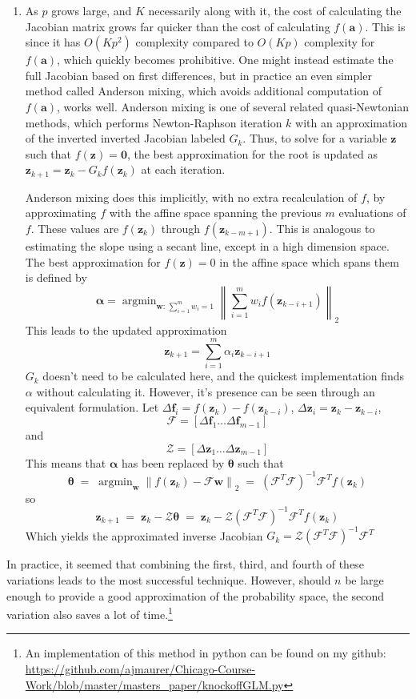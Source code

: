 \documentclass[11pt]{article}
\theoremstyle{definition}
\DeclareMathOperator*{\argmin}{arg\min}
\begin{document}
\begin{enumerate}
            \item As $p$ grows large, and $K$ necessarily along with it, the cost of calculating the Jacobian matrix grows far quicker than the cost of calculating $f(\mathbf a)$. This is since it has $O(Kp^2)$ complexity compared to $O(Kp)$ complexity for $f(\mathbf a)$, which quickly becomes prohibitive. One might instead estimate the full Jacobian based on first differences, but in practice an even simpler method called Anderson mixing\cite{Fang07twoclasses}, which avoids additional computation of $f(\mathbf a)$, works well. Anderson mixing is one of several related quasi-Newtonian methods, which performs Newton-Raphson iteration $k$ with an approximation of the inverted inverted Jacobian labeled $G_k$. Thus, to solve for a variable $\mathbf z$ such that $f(\mathbf z)=\mathbf 0$, the best approximation for the root is updated as $\mathbf{z}_{k+1}=\mathbf{z}_k - G_k f(\mathbf{z}_k)$ at each iteration. \par
    Anderson mixing does this implicitly, with no extra recalculation of $f$, by approximating $f$ with the affine space spanning the previous $m$ evaluations of $f$. These values are $f(\mathbf z_{k})$ through $f(\mathbf z_{k-m+1})$. This is analogous to estimating the slope using a secant line, except in a high dimension space. The best approximation for $f(\mathbf z)=0$ in the affine space which spans them is defined by
    \[ \mathbf \alpha = \argmin_{\mathbf w:\, \sum_{i=1}^m w_i=1} \left\|\sum_{i=1}^m  w_i f(\mathbf z_{k-i+1}) \right\|_2 \]
    This leads to the updated approximation
    \[ \mathbf z_{k+1} = \sum_{i=1}^{m} \alpha_{i} \mathbf z_{k-i+1} \]
    $G_k$ doesn't need to be calculated here, and the quickest implementation finds $\alpha$ without calculating it. However, it's presence can be seen through an equivalent formulation. Let $\Delta \mathbf f_i = f(\mathbf z_k) - f(\mathbf z_{k-i})$, $\Delta \mathbf z_i = \mathbf z_k - \mathbf z_{k-i}$, 
    \[ \mathcal F = [\Delta \mathbf f_1 \ldots \Delta \mathbf f_{m-1}] \]
    and
    \[ \mathcal Z = [\Delta \mathbf z_1 \ldots \Delta \mathbf z_{m-1}] \]
    This means that $\mathbf\alpha$ has been replaced by $\mathbf\theta$ such that
    \[ \mathbf \theta \; = \;\argmin_{\mathbf w} \left\|f(\mathbf z_{k}) - \mathcal  F \mathbf w\right\|_2\; = \;(\mathcal F^T \mathcal F)^{-1}\mathcal F^Tf(\mathbf z_k) \]
    so 
    \[ \mathbf z_{k+1} \;= \;\mathbf z_{k} - \mathcal Z \mathbf \theta\; = \; \mathbf z_{k} - \mathcal Z(\mathcal F^T \mathcal F)^{-1}\mathcal F^T f(\mathbf z_k) \]
    Which yields the approximated inverse Jacobian $G_k= \mathcal Z(\mathcal F^T \mathcal F)^{-1}\mathcal F^T$
        \end{enumerate}
        In practice, it seemed that combining the first, third, and fourth of these variations leads to the most successful technique. However, should $n$ be large enough to provide a good approximation of the probability space, the second variation also saves a lot of time.\footnote{An implementation of this method in python can be found on my github: \url{https://github.com/ajmaurer/Chicago-Course-Work/blob/master/masters_paper/knockoffGLM.py}}
\end{document}
